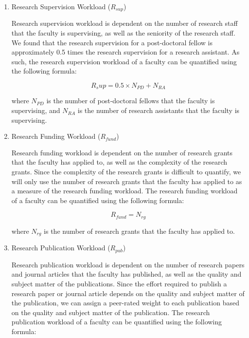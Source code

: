 \begin{enumerate}

      \item Research Supervision Workload (\(R_{sup}\))

            Research supervision workload is dependent on the number of research staff that the faculty is supervising, as well as the seniority of the research staff. We found that the research supervision for a post-doctoral fellow is approximately 0.5 times the research supervision for a research assistant. As such, the research supervision workload of a faculty can be quantified using the following formula:

            \begin{equation*}
                  R_sup = 0.5 \times N_{PD} +  N_{RA}
            \end{equation*}

            where $N_{PD}$ is the number of post-doctoral fellows that the faculty is supervising, and $N_{RA}$ is the number of research assistants that the faculty is supervising.


      \item Research Funding Workload (\(R_{fund}\))

            Research funding workload is dependent on the number of research grants that the faculty has applied to, as well as the complexity of the research grants. Since the complexity of the research grants is difficult to quantify, we will only use the number of research grants that the faculty has applied to as a measure of the research funding workload. The research funding workload of a faculty can be quantified using the following formula:

            \begin{equation*}
                  R_{fund} = N_{rg}
            \end{equation*}

            where $N_{rg}$ is the number of research grants that the faculty has applied to.

      \item Research Publication Workload (\(R_{pub}\))

            Research publication workload is dependent on the number of research papers and journal articles that the faculty has published, as well as the quality and subject matter of the publications. Since the effort required to publish a research paper or journal article depends on the quality and subject matter of the publication, we can assign a peer-rated weight to each publication based on the quality and subject matter of the publication. The research publication workload of a faculty can be quantified using the following formula:


\end{enumerate}
